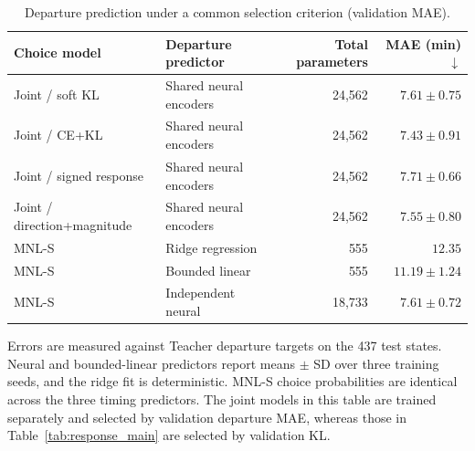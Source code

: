 \begin{table}[pos=htbp]\centering\small
\centering\small
\caption{Departure prediction under a common selection criterion (validation MAE).}
\label{tab:timing_main}
\setlength{\tabcolsep}{4pt}
\renewcommand{\arraystretch}{1.12}
\begin{tabular*}{\linewidth}{@{\extracolsep{\fill}}llrr@{}}
\toprule
Choice model & Departure predictor & Total parameters & MAE (min) $\downarrow$ \\
\midrule
Joint / soft KL & Shared neural encoders & 24,562 & $7.61\pm0.75$ \\
Joint / CE+KL & Shared neural encoders & 24,562 & $7.43\pm0.91$ \\
Joint / signed response & Shared neural encoders & 24,562 & $7.71\pm0.66$ \\
Joint / direction+magnitude & Shared neural encoders & 24,562 & $7.55\pm0.80$ \\
\midrule
MNL-S & Ridge regression & 555 & $12.35$ \\
MNL-S & Bounded linear & 555 & $11.19\pm1.24$ \\
MNL-S & Independent neural & 18,733 & $7.61\pm0.72$ \\
\bottomrule
\end{tabular*}
\par\smallskip\begin{minipage}{\linewidth}\footnotesize
Errors are measured against Teacher departure targets on the 437 test states. Neural and bounded-linear predictors report means $\pm$ SD over three training seeds, and the ridge fit is deterministic. MNL-S choice probabilities are identical across the three timing predictors. The joint models in this table are trained separately and selected by validation departure MAE, whereas those in Table~\ref{tab:response_main} are selected by validation KL.
\end{minipage}
\end{table}
